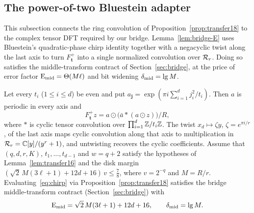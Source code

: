 \subsection{The power-of-two Bluestein adapter}\label{sec:bridge-E}

This subsection connects the ring convolution of Proposition~\ref{prop:transfer18} to the complex tensor DFT required by our bridge. Lemma~\ref{lem:bridge-E} uses Bluestein's quadratic-phase chirp identity together with a negacyclic twist along the last axis to turn $F^+_{\mathbf t}$ into a single normalized convolution over $\mathcal{R}_r$. Doing so satisfies the middle-transform contract of Section~\ref{sec:bridge}, at the price of error factor $\operatorname{E_{mid}}=\Theta(M\ell)$ and bit widening $\delta_{\rm mid}=\lg M$.

\begin{lemma}\label{lem:bridge-E}
Let every $t_i$ ($1\le i\le d$) be even and put $a_{\mathbf j}=\exp(\pi i\sum_{i=1}^dj_i^2/t_i)$. Then $a$ is periodic
in every axis and
\begin{equation}\label{eq:chirp}
  F^+_{\mathbf t}z=a\odot\bigl(\bar a*(a\odot z)\bigr)/R,
\end{equation}
where $*$ is cyclic tensor convolution over $\prod_{i=1}^d\mathbb{Z}/t_i\mathbb{Z}$. The twist $x_d\mapsto\zeta y$, $\zeta=e^{\pi i/r}$,
of the last axis maps cyclic convolution along that axis to multiplication in $\mathcal{R}_r=\mathbb{C}[y]/(y^r+1)$, and untwisting
recovers the cyclic coefficients. Assume that $(q,d,r,K)$, $t_1,\dots,t_{d-1}$ and $w=q+2$ satisfy the hypotheses of
Lemma~\ref{lem:transfer16} and the disk margin $(\sqrt2\,M(3\ell+1)+12d+16)\,v\le\frac78$, where $v=2^{-q}$ and
$M=R/r$. Evaluating~\eqref{eq:chirp} via Proposition~\ref{prop:transfer18} satisfies the bridge middle-transform
contract (Section~\ref{sec:bridge}) with
\[
  \operatorname{E_{mid}}=\sqrt2\,M(3\ell+1)+12d+16,\qquad \delta_{\rm mid}=\lg M.
\]
\end{lemma}

